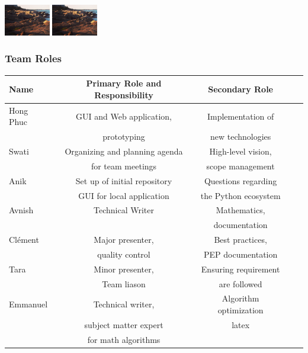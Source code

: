 \documentclass{beamer}
\begin{document}
\begin{frame}
  \hfil\hfil\includegraphics[width=2cm]{Screen Shot}
  \hfil\hfil\hfil\includegraphics[width=2cm]{Screen Shot}\newline
  \null\hfil\hfil{}
  \hfil\hfil\makebox[2cm]{\[x^y\]}
  \hfil\hfil{}\newline
  \end{frame}
  
  
  
    \begin{frame}
  \frametitle{Team Roles}
  \small
  \begin{table}
\begin{tabular}{l | c | c | c | c }
Name & Primary Role and Responsibility & Secondary Role \\
\hline
Hong Phuc & GUI and Web application,& Implementation of\\
& prototyping & new technologies\\
 \hline
Swati & Organizing and planning agenda& High-level vision, \\
& for team meetings & scope management\\
 \hline
Anik & Set up of initial repository& Questions regarding\\
& GUI for local application & the Python ecosystem\\
 \hline
Avnish & Technical Writer & Mathematics, \\
& & documentation\\
 \hline
Clément & Major presenter, & Best practices, \\
& quality control  & PEP documentation\\
 \hline
Tara & Minor presenter, & Ensuring requirement \\
& Team liason  & are followed\\
 \hline
Emmanuel & Technical writer, &  Algorithm optimization\\
& subject matter expert  & latex\\
& for math algorithms  & \\
\end{tabular}
\end{table}
  \end{frame}
\end{document}
